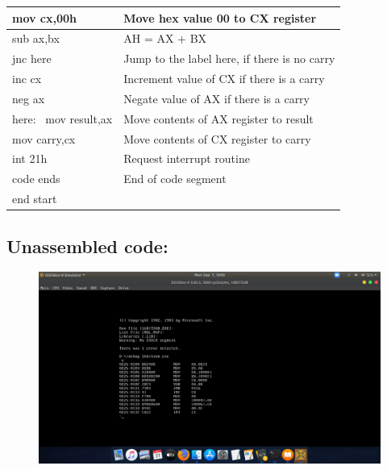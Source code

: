 \documentclass[12pt,a4paper]{article}
\begin{document}
\begin{flushleft}
\begin{table}[htb]
{\begin{tabular}{|l|l|}
\hline
mov cx,00h                                                       & Move hex value 00 to CX register              \\ 
\hline
sub ax,bx                                                        & AH = AX + BX                                  \\ 
\hline
jnc here                                                         & Jump to the label here, if there is no carry  \\ 
\hline
inc cx                                                           & Increment value of CX if there is a carry     \\ 
\hline
neg ax                                                           & Negate value of AX if there is a carry        \\
\hline
here:~ mov result,ax                                             & Move contents of AX register to result        \\ 
\hline
mov carry,cx                                                     & Move contents of CX register to carry         \\ 
\hline
int 21h                                                          & Request interrupt routine                     \\ 
\hline
code ends                                                        & End of code segment                           \\
\hline
end start                                                        &                                               \\
\hline
\end{tabular}
}
\end{table}

\newpage
\subsection*{\textbf{Unassembled code:}}
\begin{figure}[h]
    \centering
    \includegraphics[trim = 100mm 60mm 150mm 127mm, clip, width = \textwidth]{SubtractionUS.png}
\end{figure}

\end{flushleft}
\end{document}
